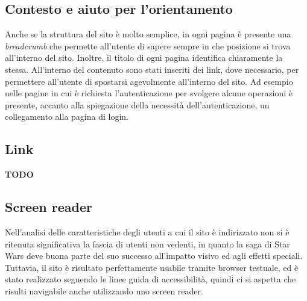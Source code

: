 \subsection{Contesto e aiuto per l'orientamento}
Anche se la struttura del sito è molto semplice, in ogni pagina è presente una \textit{breadcrumb} che permette all'utente di sapere sempre in che posizione si trova all'interno del sito. Inoltre, il titolo di ogni pagina identifica chiaramente la stessa. \newline
All'interno del contenuto sono stati inseriti dei link, dove necessario, per permettere all'utente di spostarsi agevolmente all'interno del sito. Ad esempio nelle pagine in cui è richiesta l'autenticazione per svolgere alcune operazioni è presente, accanto alla spiegazione della necessità dell'autenticazione, un collegamento alla pagina di login.

\subsection{Link}
\textbf{TODO}

\subsection{Screen reader}
Nell'analisi delle caratteristiche degli utenti a cui il sito è indirizzato non si è ritenuta significativa la fascia di utenti non vedenti, in quanto la saga di Star Wars deve buona parte del suo successo all'impatto visivo ed agli effetti speciali. \newline
Tuttavia, il sito è risultato perfettamente usabile tramite browser testuale, ed è stato realizzato seguendo le linee guida di accessibilità, quindi ci si aspetta che risulti navigabile anche utilizzando uno screen reader.
